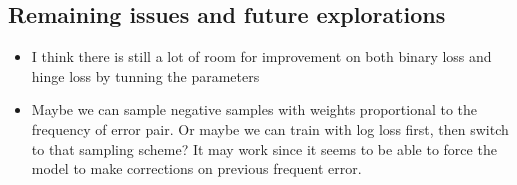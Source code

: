 \documentclass[11pt]{article}
\begin{document}
\subsection{Remaining issues and future
explorations}\label{remaining-issues-and-future-explorations}

\begin{itemize}
\item
  I think there is still a lot of room for improvement on both binary
  loss and hinge loss by tunning the parameters
\item
  Maybe we can sample negative samples with weights proportional to the
  frequency of error pair. Or maybe we can train with log loss first,
  then switch to that sampling scheme? It may work since it seems to be
  able to force the model to make corrections on previous frequent
  error.
\end{itemize}


    
    
    
    
\end{document}
